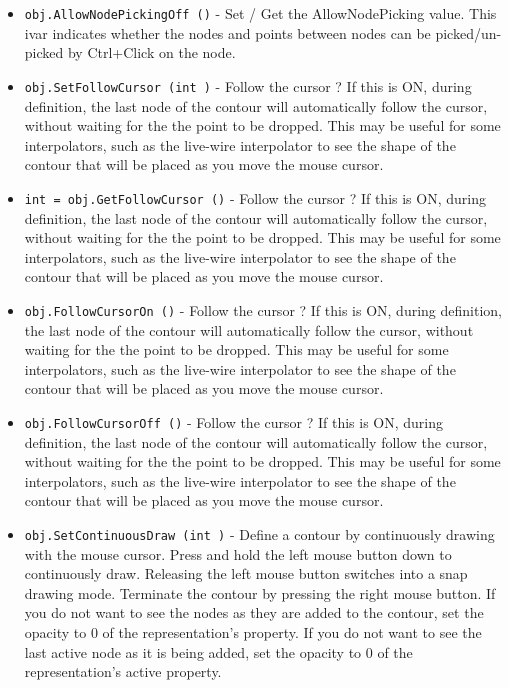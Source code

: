 \begin{itemize}
\item  \verb|obj.AllowNodePickingOff ()| -  Set / Get the AllowNodePicking value. This ivar indicates whether the nodes
 and points between nodes can be picked/un-picked by Ctrl+Click on the node.

\item  \verb|obj.SetFollowCursor (int )| -  Follow the cursor ? If this is ON, during definition, the last node of the
 contour will automatically follow the cursor, without waiting for the the
 point to be dropped. This may be useful for some interpolators, such as the
 live-wire interpolator to see the shape of the contour that will be placed
 as you move the mouse cursor.

\item  \verb|int = obj.GetFollowCursor ()| -  Follow the cursor ? If this is ON, during definition, the last node of the
 contour will automatically follow the cursor, without waiting for the the
 point to be dropped. This may be useful for some interpolators, such as the
 live-wire interpolator to see the shape of the contour that will be placed
 as you move the mouse cursor.

\item  \verb|obj.FollowCursorOn ()| -  Follow the cursor ? If this is ON, during definition, the last node of the
 contour will automatically follow the cursor, without waiting for the the
 point to be dropped. This may be useful for some interpolators, such as the
 live-wire interpolator to see the shape of the contour that will be placed
 as you move the mouse cursor.

\item  \verb|obj.FollowCursorOff ()| -  Follow the cursor ? If this is ON, during definition, the last node of the
 contour will automatically follow the cursor, without waiting for the the
 point to be dropped. This may be useful for some interpolators, such as the
 live-wire interpolator to see the shape of the contour that will be placed
 as you move the mouse cursor.

\item  \verb|obj.SetContinuousDraw (int )| -  Define a contour by continuously drawing with the mouse cursor.
 Press and hold the left mouse button down to continuously draw.
 Releasing the left mouse button switches into a snap drawing mode.
 Terminate the contour by pressing the right mouse button.  If you
 do not want to see the nodes as they are added to the contour, set the
 opacity to 0 of the representation's property.  If you do not want to 
 see the last active node as it is being added, set the opacity to 0 
 of the representation's active property.


\end{itemize}
